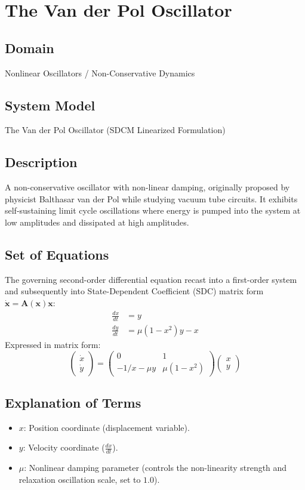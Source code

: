 \chapter{The Van der Pol Oscillator}

\section{Domain}
Nonlinear Oscillators / Non-Conservative Dynamics

\section{System Model}
The Van der Pol Oscillator (SDCM Linearized Formulation)

\section{Description}
A non-conservative oscillator with non-linear damping, originally proposed by physicist Balthasar van der Pol while studying vacuum tube circuits. It exhibits self-sustaining limit cycle oscillations where energy is pumped into the system at low amplitudes and dissipated at high amplitudes.

\section{Set of Equations}
The governing second-order differential equation recast into a first-order system and subsequently into State-Dependent Coefficient (SDC) matrix form $\dot{\mathbf{x}} = \mathbf{A}(\mathbf{x})\mathbf{x}$:
\begin{align}
\frac{dx}{dt} &= y \\
\frac{dy}{dt} &= \mu (1 - x^2)y - x
\end{align}
Expressed in matrix form:
\begin{equation}
\begin{pmatrix} \dot{x} \\ \dot{y} \end{pmatrix} = \begin{pmatrix} 0 & 1 \\ -1/x - \mu y & \mu (1 - x^2) \end{pmatrix} \begin{pmatrix} x \\ y \end{pmatrix}
\end{equation}

\section{Explanation of Terms}
\begin{itemize}
    \item $x$: Position coordinate (displacement variable).
    \item $y$: Velocity coordinate ($\frac{dx}{dt}$).
    \item $\mu$: Nonlinear damping parameter (controls the non-linearity strength and relaxation oscillation scale, set to $1.0$).
\end{itemize}

